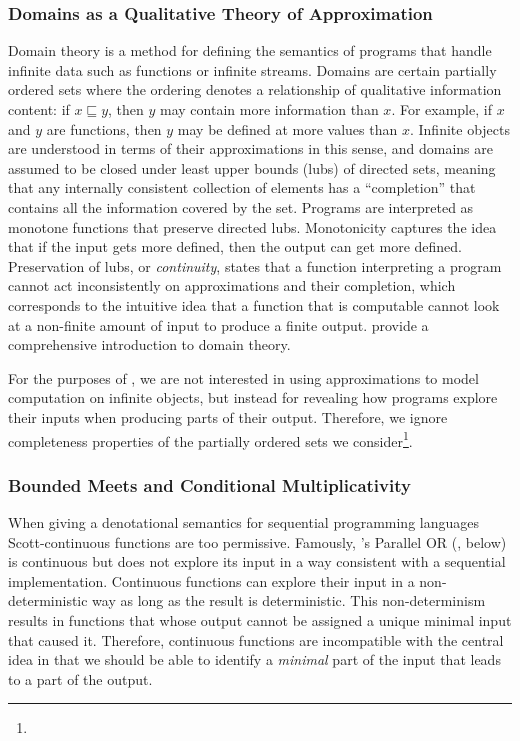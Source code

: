 \subsubsection{Domains as a Qualitative Theory of Approximation}

Domain theory is a method for defining the semantics of programs that
handle infinite data such as functions or infinite streams. Domains
are certain partially ordered sets where the ordering denotes a
relationship of qualitative information content: if $x \sqsubseteq y$,
then $y$ may contain more information than $x$. For example, if $x$
and $y$ are functions, then $y$ may be defined at more values than
$x$. Infinite objects are understood in terms of their approximations
in this sense, and domains are assumed to be closed under least upper
bounds (lubs) of directed sets, meaning that any internally consistent
collection of elements has a ``completion'' that contains all the
information covered by the set. Programs are interpreted as monotone
functions that preserve directed lubs. Monotonicity captures the idea
that if the input gets more defined, then the output can get more
defined. Preservation of lubs, or \emph{continuity}, states that a
function interpreting a program cannot act inconsistently on
approximations and their completion, which corresponds to the
intuitive idea that a function that is computable cannot look at a
non-finite amount of input to produce a finite output. \citet{abramsky-jung} provide a comprehensive introduction to domain theory.

For the purposes of \GPS, we are not interested in using
approximations to model computation on infinite objects, but instead
for revealing how programs explore their inputs when producing parts
of their output. Therefore, we ignore completeness properties of the
partially ordered sets we consider\footnote{}.

\subsubsection{Bounded Meets and Conditional Multiplicativity}
\label{sec:bounded-meets-and-cm}

When giving a denotational semantics for sequential programming
languages Scott-continuous functions are too permissive. Famously,
\citet{plotkin77lcf}'s Parallel OR (, below) is
continuous but does not explore its input in a way consistent with a
sequential implementation. Continuous functions can explore their
input in a non-deterministic way as long as the result is
deterministic. This non-determinism results in functions that whose
output cannot be assigned a unique minimal input that caused
it. Therefore, continuous functions are incompatible with the central
idea in \GPS that we should be able to identify a \emph{minimal} part
of the input that leads to a part of the output.

